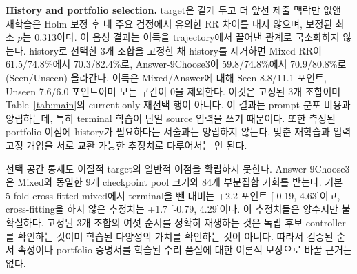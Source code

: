 \documentclass[10pt,conference]{IEEEtran}
\begin{document}
\noindent\textbf{History and portfolio selection.} target은 같게 두고 더 앞선 제출 맥락만 없앤 재학습은 Holm 보정 후 네 주요 검정에서 유의한 RR 차이를 내지 않으며, 보정된 최소 \(p\)는 0.313이다. 이 음성 결과는 이득을 trajectory에서 끌어낸 관계로 국소화하지 않는다. history로 선택한 3개 조합을 고정한 채 history를 제거하면 Mixed RR이 61.5/74.8\%에서 70.3/82.4\%로, Answer-9Choose3이 59.8/74.8\%에서 70.9/80.8\%로(Seen/Unseen) 올라간다. 이득은 Mixed/Answer에 대해 Seen 8.8/11.1 포인트, Unseen 7.6/6.0 포인트이며 모든 구간이 0을 제외한다. 이것은 고정된 3개 조합이며 Table~\ref{tab:main}의 current-only 재선택 행이 아니다. 이 결과는 prompt 분포 비용과 양립하는데, 특히 terminal 학습이 단일 source 입력을 쓰기 때문이다. 또한 측정된 portfolio 이점에 history가 필요하다는 서술과는 양립하지 않는다. 맞춘 재학습과 입력 고정 개입을 서로 교환 가능한 추정치로 다루어서는 안 된다.

선택 공간 통제도 이질적 target의 일반적 이점을 확립하지 못한다. Answer-9Choose3은 Mixed와 동일한 9개 checkpoint pool 크기와 84개 부분집합 기회를 받는다. 기본 5-fold cross-fitted mixed에서 terminal을 뺀 대비는 +2.2 포인트 [-0.19, 4.63]이고, cross-fitting을 하지 않은 추정치는 +1.7 [-0.79, 4.29]이다. 이 추정치들은 양수지만 불확실하다. 고정된 3개 조합의 여섯 순서를 정확히 재생하는 것은 독립 후보 controller를 확인하는 것이며 학습된 다양성의 가치를 확인하는 것이 아니다. 따라서 검증된 순서 속성이나 portfolio 증명서를 학습된 수리 품질에 대한 이론적 보장으로 바꿀 근거는 없다.
\end{document}
